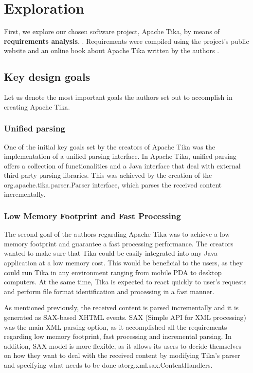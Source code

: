 \documentclass{article}
\begin{document}
\section{Exploration}
First, we explore our chosen software project, Apache Tika, by means of \textbf{requirements analysis}. \citep{dresner1964maintenance}. Requirements were compiled using the project's public website \citep{apache_software_foundation_2020} and an online book about Apache Tika written by the authors \citep{tika_in_action}. 

\subsection{Key design goals}
Let us denote the most important goals the authors set out to accomplish in creating Apache Tika.
\subsubsection{Unified parsing}
One of the initial key goals set by the creators of Apache Tika was the implementation of a unified parsing interface.  In Apache Tika, unified parsing offers a collection of functionalities and a Java interface that deal with external third-party parsing libraries. This was achieved by the creation of the org.apache.tika.parser.Parser interface, which parses the received content incrementally.

\subsubsection{Low Memory Footprint and Fast Processing}
The second goal of the authors regarding Apache Tika was to achieve a low memory footprint and guarantee a fast processing performance. The creators wanted to make sure that Tika could be easily integrated into any Java application at a low memory cost. This would be beneficial to the users, as they could run Tika in any environment ranging from mobile PDA to desktop computers. At the same time, Tika is expected to react quickly to user’s requests and perform file format identification and processing in a fast manner.

As mentioned previously, the received content is parsed incrementally and it is generated as SAX-based XHTML events. SAX (Simple API for XML processing) was the main XML parsing option, as it accomplished all the requirements regarding low memory footprint, fast processing and incremental parsing. In addition, SAX model is more flexible, as it allows its users to decide themselves on how they want to deal with the received content by modifying Tika’s parser and specifying what needs to be done atorg.xml.sax.ContentHandlers.
\end{document}
